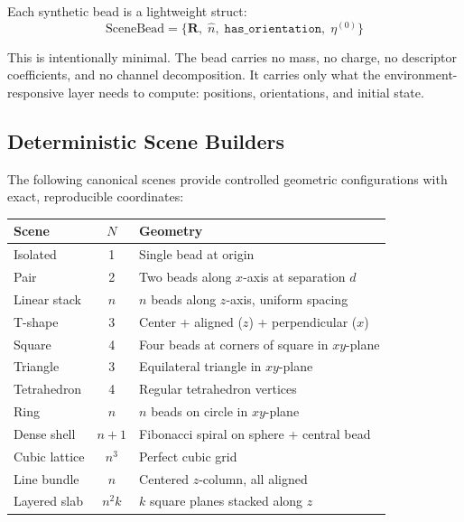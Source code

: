 \documentclass[11pt]{article}
\begin{document}
Each synthetic bead is a lightweight struct:
\begin{equation}
    \text{SceneBead} = \bigl\{
        \mathbf{R},\;
        \hat{n},\;
        \texttt{has\_orientation},\;
        \eta^{(0)}
    \bigr\}
\end{equation}

This is intentionally minimal.  The bead carries no mass, no charge, no
descriptor coefficients, and no channel decomposition.  It carries only
what the environment-responsive layer needs to compute: positions,
orientations, and initial state.

\subsection{Deterministic Scene Builders}

The following canonical scenes provide controlled geometric configurations
with exact, reproducible coordinates:

\begin{center}
\begin{tabular}{lcp{6.5cm}}
    \textbf{Scene} & \textbf{$N$} & \textbf{Geometry} \\
    \midrule
    Isolated       & 1   & Single bead at origin \\
    Pair           & 2   & Two beads along $x$-axis at separation $d$ \\
    Linear stack   & $n$ & $n$ beads along $z$-axis, uniform spacing \\
    T-shape        & 3   & Center + aligned ($z$) + perpendicular ($x$) \\
    Square         & 4   & Four beads at corners of square in $xy$-plane \\
    Triangle       & 3   & Equilateral triangle in $xy$-plane \\
    Tetrahedron    & 4   & Regular tetrahedron vertices \\
    Ring           & $n$ & $n$ beads on circle in $xy$-plane \\
    Dense shell    & $n{+}1$ & Fibonacci spiral on sphere + central bead \\
    Cubic lattice  & $n^3$ & Perfect cubic grid \\
    Line bundle    & $n$ & Centered $z$-column, all aligned \\
    Layered slab   & $n^2 k$ & $k$ square planes stacked along $z$ \\
\end{tabular}
\end{center}
\end{document}
